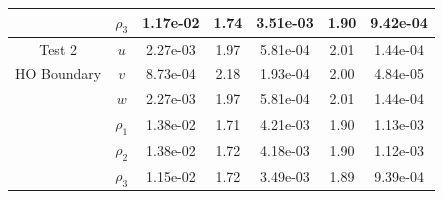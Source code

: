 \documentclass[final]{siamltex}
\begin{document}
\begin{table}[h]
\begin{center}
\begin{tabular}{ccccccc}
                    & $\rho_3$ & 1.17e-02 & 1.74 & 3.51e-03 & 1.90 & 9.42e-04 \\
\hline
Test 2              & $u$      & 2.27e-03 & 1.97 & 5.81e-04 & 2.01 & 1.44e-04 \\
HO Boundary         & $v$      & 8.73e-04 & 2.18 & 1.93e-04 & 2.00 & 4.84e-05 \\
                    & $w$      & 2.27e-03 & 1.97 & 5.81e-04 & 2.01 & 1.44e-04 \\
                    & $\rho_1$ & 1.38e-02 & 1.71 & 4.21e-03 & 1.90 & 1.13e-03 \\
                    & $\rho_2$ & 1.38e-02 & 1.72 & 4.18e-03 & 1.90 & 1.12e-03 \\
                    & $\rho_3$ & 1.15e-02 & 1.72 & 3.49e-03 & 1.89 & 9.39e-04
\end{tabular}
\end{center}
\end{table}
\end{document}
